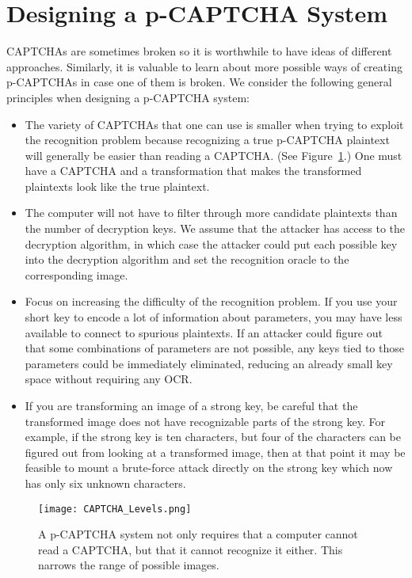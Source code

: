 \documentclass[12pt]{article}
\begin{document}
\section*{Designing a p-CAPTCHA System}

CAPTCHAs are sometimes broken so it is worthwhile to have ideas of different approaches. Similarly, it is valuable to learn about more possible ways of creating p-CAPTCHAs in case one of them is broken. We consider the following general principles when designing a p-CAPTCHA system:
\begin{itemize}
\item The variety of CAPTCHAs that one can use is smaller when trying to exploit the recognition problem because recognizing a true p-CAPTCHA plaintext will generally be easier than reading a CAPTCHA. (See Figure~{\ref{CAPTCHALevels}}.) One must have a CAPTCHA and a transformation that makes the transformed plaintexts look like the true plaintext.
\item The computer will not have to filter through more candidate plaintexts than the number of decryption keys. We assume that the attacker has access to the decryption algorithm, in which case the attacker could put each possible key into the decryption algorithm and set the recognition oracle to the corresponding image.
\item Focus on increasing the difficulty of the recognition problem. If you use your short key to encode a lot of information about parameters, you may have less available to connect to spurious plaintexts. If an attacker could figure out that some combinations of parameters are not possible, any keys tied to those parameters could be immediately eliminated, reducing an already small key space without requiring any OCR.
\item If you are transforming an image of a strong key, be careful that the transformed image does not have recognizable parts of the strong key. For example, if the strong key is ten characters, but four of the characters can be figured out from looking at a transformed image, then at that point it may be feasible to mount a brute-force attack directly on the strong key which now has only six unknown characters.
\end{itemize}

\begin{figure}
	\begin{center}
		\texttt{[image: CAPTCHA\_Levels.png]}
	\end{center}
	\caption{A p-CAPTCHA system not only requires that a computer cannot read a CAPTCHA, but that it cannot recognize it either. This narrows the range of possible images.}
\label{CAPTCHALevels}
\end{figure}
\end{document}
